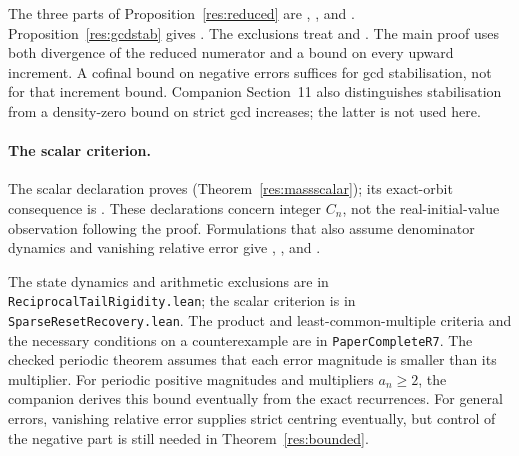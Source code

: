 \documentclass[11pt]{article}
\begin{document}
The three parts of Proposition~\ref{res:reduced} are ,
, and
.
Proposition~\ref{res:gcdstab} gives .
The exclusions treat 
and .
The main proof uses both divergence of the reduced numerator and a bound
on every upward increment. A cofinal bound on negative errors suffices
for gcd stabilisation, not for that increment bound. Companion Section~11
also distinguishes stabilisation from a density-zero bound on strict gcd
increases; the latter is not used here.

\paragraph{The scalar criterion.}
The scalar declaration proves 
(Theorem~\ref{res:massscalar});
its exact-orbit consequence is .
These declarations concern integer $C_n$, not the real-initial-value
observation following the proof. Formulations that also assume denominator
dynamics and vanishing relative error give ,
,
and .

The state dynamics and arithmetic exclusions are in
\texttt{ReciprocalTailRigidity.lean}; the scalar criterion is in
\texttt{SparseResetRecovery.lean}. The product and least-common-multiple
criteria and the necessary conditions on a counterexample are in
\texttt{PaperCompleteR7}.
The checked periodic theorem assumes that each error magnitude is smaller
than its multiplier. For periodic positive magnitudes and multipliers
$a_n\ge2$, the companion derives this bound eventually from the exact
recurrences. For general errors, vanishing relative error supplies
strict centring eventually, but control of the negative part is still
needed in Theorem~\ref{res:bounded}.
\end{document}
